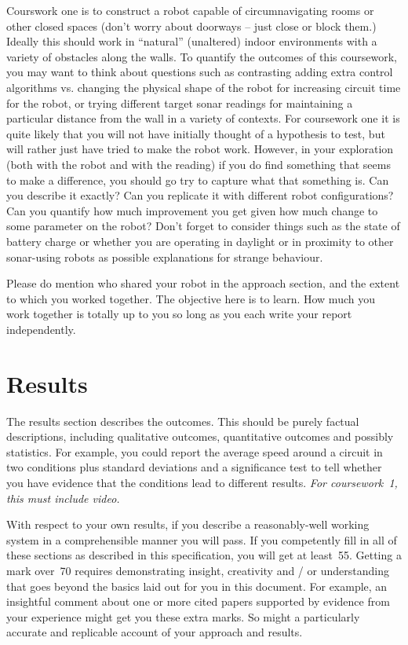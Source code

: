 \documentclass[a4paper,12pt]{article}
\begin{document}
Courswork one is to construct a robot capable of circumnavigating
rooms or other closed spaces (don't worry about doorways -- just close
or block them.)  Ideally this should work in ``natural'' (unaltered) indoor
environments with a variety of obstacles along the walls.  To quantify
the outcomes of this coursework, you may want to think about questions
such as contrasting adding extra control algorithms vs. changing the
physical shape of the robot for increasing circuit time for the robot,
or trying different target sonar readings for maintaining a particular
distance from the wall in a variety of contexts.  For coursework one
it is quite likely that you will not have initially thought of a
hypothesis to test, but will rather just have tried to make the robot
work.  However, in your exploration (both with the robot and with the
reading) if you do find something that seems to make a difference, you
should go try to capture what that something is.  Can you describe it
exactly?  Can you replicate it with different robot configurations?
Can you quantify how much improvement you get given how much change to
some parameter on the robot?  Don't forget to consider things such as
the state of battery charge or whether you are operating in daylight
or in proximity to other sonar-using robots as possible explanations
for strange behaviour.

Please do mention who shared your robot in the approach section, and
the extent to which you worked together.  The objective here is to
learn.  How much you work together is totally up to you so long as you
each write your report independently.

\section{Results}

The results section describes the outcomes.  This should be purely
factual descriptions, including qualitative outcomes, quantitative
outcomes and possibly statistics.  For example, you could report the
average speed around a circuit in two conditions plus standard
deviations and a significance test to tell whether you have evidence
that the conditions lead to different results. {\em For coursework~1, this
must include video.}

With respect to your own results, if you describe a reasonably-well
working system in a comprehensible manner you will pass.  If you
competently fill in all of these sections as described in this
specification, you will get at least~55.  Getting a mark over~70
requires demonstrating insight, creativity and / or understanding that
goes beyond the basics laid out for you in this document.  For
example, an insightful comment about one or more cited papers
supported by evidence from your experience might get you these extra
marks.  So might a particularly accurate and replicable account of
your approach and results.
\end{document}
